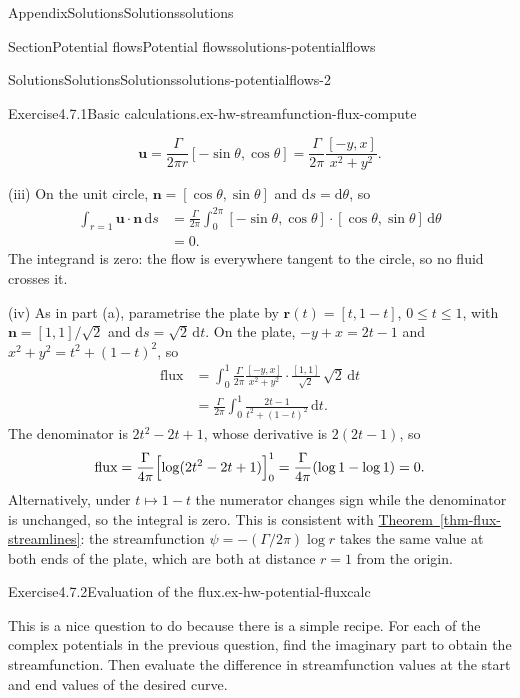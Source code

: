 \documentclass[oneside,10pt,]{book}
\newcommand{\xreffont}{\relax}
\numberwithin{equation}{section}
\newcommand{\de}{\mathrm{d}}
\newcommand{\bn}{\boldsymbol{n}}
\newcommand{\bu}{\boldsymbol{u}}
\newcommand{\br}{\boldsymbol{r}}
\newcommand{\amp}{&}
\begin{document}
\begin{appendixptx}{Appendix}{Solutions}{}{Solutions}{}{}{solutions}
\begin{sectionptx}{Section}{Potential flows}{}{Potential flows}{}{}{solutions-potentialflows}
\begin{solutions-subsection-numberless}{Solutions}{Solutions}{}{Solutions}{}{}{solutions-potentialflows-2}
\begin{exercisegroup}
\begin{divisionsolutioneg}{Exercise}{4.7.1}{Basic calculations.}{ex-hw-streamfunction-flux-compute}
\begin{enumerate}[font=\bfseries,label=(\alph*),ref=\alph*]
\begin{equation*}
\bu = \frac{\Gamma}{2\pi r}[-\sin\theta, \cos\theta] = \frac{\Gamma}{2\pi}\frac{[-y, x]}{x^2 + y^2}.
\end{equation*}
%
\par
(iii) On the unit circle, \(\bn = [\cos\theta, \sin\theta]\) and \(\de{s} = \de\theta\), so%
\begin{align*}
\int_{r = 1} \bu \cdot \bn \, \de{s} \amp= \frac{\Gamma}{2\pi}\int_0^{2\pi} [-\sin\theta, \cos\theta] \cdot [\cos\theta, \sin\theta] \, \de\theta\\
\amp= 0.
\end{align*}
The integrand is zero: the flow is everywhere tangent to the circle, so no fluid crosses it.%
\par
(iv) As in part (a), parametrise the plate by \(\br(t) = [t, 1 - t]\), \(0 \leq t \leq 1\), with \(\bn = [1, 1]/\sqrt{2}\) and \(\de{s} = \sqrt{2}\,\de{t}\). On the plate, \(-y + x = 2t - 1\) and \(x^2 + y^2 = t^2 + (1 - t)^2\), so%
\begin{align*}
\textrm{flux} \amp= \int_0^1 \frac{\Gamma}{2\pi}\frac{[-y, x]}{x^2 + y^2} \cdot \frac{[1, 1]}{\sqrt{2}} \, \sqrt{2}\,\de{t}\\
\amp= \frac{\Gamma}{2\pi}\int_0^1 \frac{2t - 1}{t^2 + (1 - t)^2}\,\de{t}.
\end{align*}
The denominator is \(2t^2 - 2t + 1\), whose derivative is \(2(2t - 1)\), so%
\begin{equation*}
\textrm{flux} = \frac{\Gamma}{4\pi}\Bigl[\log(2t^2 - 2t + 1)\Bigr]_0^1 = \frac{\Gamma}{4\pi}(\log 1 - \log 1) = 0.
\end{equation*}
Alternatively, under \(t \mapsto 1 - t\) the numerator changes sign while the denominator is unchanged, so the integral is zero. This is consistent with \hyperref[thm-flux-streamlines]{Theorem~{\xreffont\ref{thm-flux-streamlines}}}: the streamfunction \(\psi = -(\Gamma/2\pi)\log r\) takes the same value at both ends of the plate, which are both at distance \(r = 1\) from the origin.%
\end{enumerate}%
\end{divisionsolutioneg}%
\begin{divisionsolutioneg}{Exercise}{4.7.2}{Evaluation of the flux.}{ex-hw-potential-fluxcalc}%
\par\smallskip%
\noindent\hypertarget{ex-hw-potential-fluxcalc-3-main}{}This is a nice question to do because there is a simple recipe. For each of the complex potentials in the previous question, find the imaginary part to obtain the streamfunction. Then evaluate the difference in streamfunction values at the start and end values of the desired curve.%

\end{divisionsolutioneg}
\end{exercisegroup}
\end{solutions-subsection-numberless}
\end{sectionptx}
\end{appendixptx}
\end{document}
